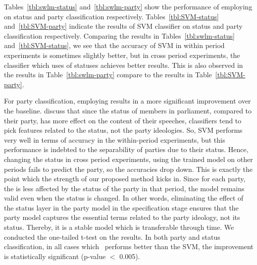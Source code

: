 



Tables~\ref{tbl:swlm-status} and~\ref{tbl:swlm-party} show the performance of employing \acswlm on status and party classification respectively. 
Tables~\ref{tbl:SVM-status} and~\ref{tbl:SVM-party} indicate the results of SVM classifier on status and party classification respectively. Comparing the results in Tables~\ref{tbl:swlm-status} and~\ref{tbl:SVM-status}, we see that the accuracy of SVM in within period experiments is sometimes slightly better, but in cross period experiments, the classifier which uses \acswlm of statuses achieves better results.  This is also observed in the results in Table~\ref{tbl:swlm-party} compare to the results in Table~\ref{tbl:SVM-party}. 
%

For party classification, employing \acswlm results in a more significant improvement over the baseline.  \citet{Hirst:2014} discuss that since the status of members in parliament, compared to their party, has more effect on the content of their speeches, classifiers tend to pick features related to the status, not the party ideologies. So, SVM performs very well in terms of accuracy in the within-period experiments, but this performance is indebted to the separability of parties due to their status. Hence, changing the status in cross period experiments, using the trained model on other periods fails to predict the party, so the accuracies drop down. This is exactly the point which the strength of our proposed method kicks in. 
Since for each party, the \acswlm is less affected by the status of the party in that period, the model remains valid even when the status is changed.  In other words, eliminating the effect of the status layer in the party model in the specification stage ensures that the party model captures the essential terms related to the party ideology, not its status. Thereby, it is a stable model which is transferable through time.
%
We conducted the one-tailed t-test on the results. In both party and status classification, in all cases which \acswlm\ performs better than the SVM, the improvement is statistically significant ({p-value} $<$ 0.005).

